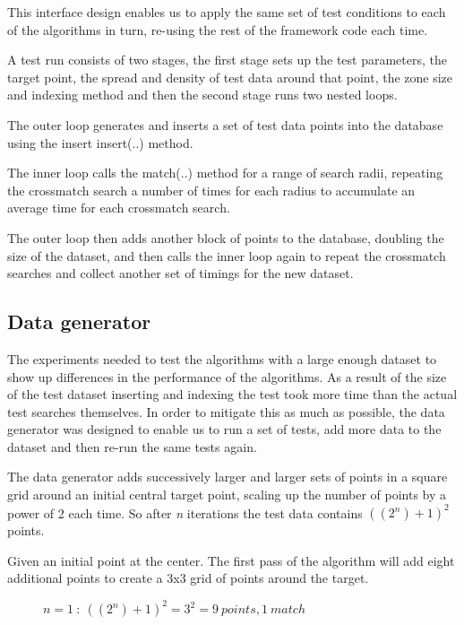\documentclass{article}
\newcommand{\crossmatch} {crossmatch\xspace}
\newcommand{\dataset} {dataset\xspace}
\newcommand{\javaname}[1] {{\ttfamily\color{codeblue} #1}}
\begin{document}
This interface design enables us to apply the same set of test conditions to each of the algorithms in turn, re-using the rest of the framework code each time.

A test run consists of two stages, the first stage sets up the test parameters, the target point, the spread and density of test data around that point, the zone size and indexing method and then the second stage runs two nested loops.

The outer loop generates and inserts a set of test data points into the database using the insert \javaname{insert(..)} method.

The inner loop calls the \javaname{match(..)} method for a range of search radii, repeating the \crossmatch search a number of times for each radius to accumulate an average time for each \crossmatch search.

The outer loop then adds another block of points to the database, doubling the size of the \dataset, and then calls the inner loop again to repeat the \crossmatch searches and collect another set of timings for the new \dataset.

\subsection{Data generator}
\label{test-data-generator}

The experiments needed to test the algorithms with a large enough \dataset to show up differences in the performance of the algorithms.
As a result of the size of the test \dataset inserting and indexing the test took more time than the actual test searches themselves.
In order to mitigate this as much as possible, the data generator was designed to enable us to run a set of tests, add more data to the \dataset and then re-run the same tests again.

The data generator adds successively larger and larger sets of points in a square grid around an initial central target point, scaling up the number of points by a power of 2 each time.
So after \textit{n} iterations the test data contains \(((2^n)+1)^2\) points.

Given an initial point at the center. The first pass of the algorithm will add eight additional points to create a 3x3 grid of points around the target. 
\begin{figure}[h]

\caption{$n=1 \ :\ ((2^n)+1)^2 = 3^2 = 9 \ points, 1 \ match$}
\label{fig:data-count-01}
\end{figure}
\end{document}
